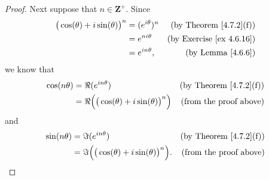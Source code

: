 \begin{proof}
    Next suppose that \(n \in \mathbf{Z}^+\).
    Since
    \begin{align*}
        \big(\cos(\theta) + i \sin(\theta)\big)^n & = (e^{i \theta})^n & \text{(by Theorem \ref{4.7.2}(f))}   \\
                                                  & = e^{n i \theta}   & \text{(by Exercise \ref{ex 4.6.16})} \\
                                                  & = e^{i n \theta},  & \text{(by Lemma \ref{4.6.6})}
    \end{align*}
    we know that
    \begin{align*}
        \cos(n \theta) & = \Re(e^{i n \theta})                                    & \text{(by Theorem \ref{4.7.2}(f))} \\
                       & = \Re\Big(\big(\cos(\theta) + i \sin(\theta)\big)^n\Big) & \text{(from the proof above)}
    \end{align*}
    and
    \begin{align*}
        \sin(n \theta) & = \Im(e^{i n \theta})                                     & \text{(by Theorem \ref{4.7.2}(f))} \\
                       & = \Im\Big(\big(\cos(\theta) + i \sin(\theta)\big)^n\Big). & \text{(from the proof above)}
    \end{align*}


\end{proof}
